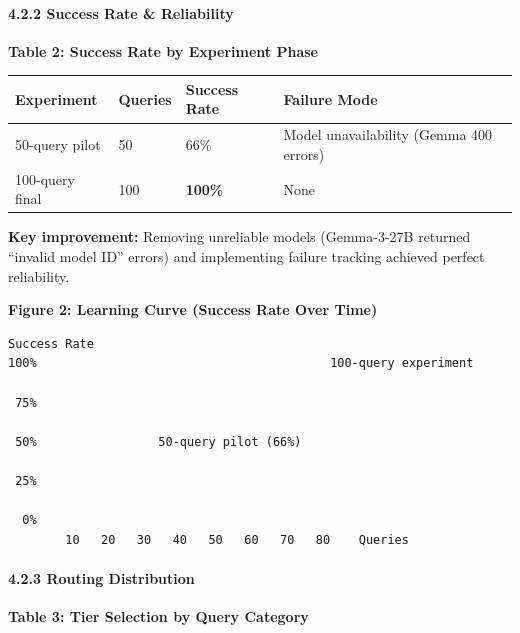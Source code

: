 \hypertarget{success-rate-reliability}{%
\paragraph{4.2.2 Success Rate \&
Reliability}\label{success-rate-reliability}}

\textbf{Table 2: Success Rate by Experiment Phase}

\begin{longtable}[]{@{}llll@{}}
\toprule
Experiment & Queries & Success Rate & Failure Mode \\
\midrule
\endhead
50-query pilot & 50 & 66\% & Model unavailability (Gemma 400 errors) \\
100-query final & 100 & \textbf{100\%} & None \\
\bottomrule
\end{longtable}

\textbf{Key improvement:} Removing unreliable models (Gemma-3-27B
returned ``invalid model ID'' errors) and implementing failure tracking
achieved perfect reliability.

\textbf{Figure 2: Learning Curve (Success Rate Over Time)}

\begin{verbatim}
Success Rate
100%                                         100-query experiment
      
 75%  
      
 50%                 50-query pilot (66%)
               
 25%         
           
  0%                                              
        10   20   30   40   50   60   70   80    Queries
\end{verbatim}

\hypertarget{routing-distribution-1}{%
\paragraph{4.2.3 Routing Distribution}\label{routing-distribution-1}}

\textbf{Table 3: Tier Selection by Query Category}

